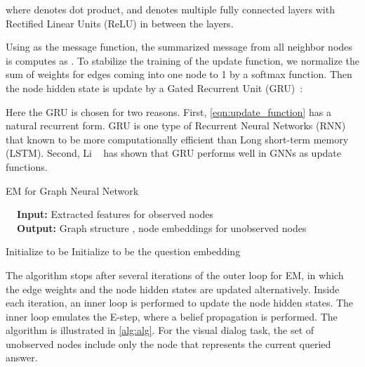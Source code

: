 \documentclass[10pt,twocolumn,letterpaper]{article}
\begin{document}
where  denotes dot product, and  denotes multiple fully connected layers with Rectified Linear Units (ReLU) in between the layers.

Using  as the message function, the summarized message from all neighbor nodes is computes as . To stabilize the training of the update function, we normalize the sum of weights for edges coming into one node to 1 by a softmax function. Then the node hidden state is update by a Gated Recurrent Unit (GRU)~\cite{cho2014learning}:
\vspace{-4pt}

Here the GRU is chosen for two reasons. First, \autoref{eqn:update_function} has a natural recurrent form. GRU is one type of Recurrent Neural Networks (RNN) that known to be more computationally efficient than Long short-term memory (LSTM). Second, Li \etal~\cite{li2016gated} has shown that GRU performs well in GNNs as update functions.

\begin{algorithm}[!t]\small
\caption{\small EM for Graph Neural Network}
\label{alg:alg}
\begin{flushleft}
\textbf{~~Input:} Extracted features  for observed nodes \\
\textbf{~~Output:} Graph structure , node embeddings  for unobserved nodes 
\end{flushleft}
\vspace{-10pt}
\begin{algorithmic}[1]
\STATE Initialize  to be 
\ENDFOR
{}
\STATE Initialize  to be the question embedding
\ENDFOR
{}
\STATE 
\ENDFOR
{}
\STATE 
{}
\STATE 
\ENDFOR
\ENDFOR
\ENDWHILE
\end{algorithmic}
\end{algorithm}

The algorithm stops after several iterations of the outer loop for EM, in which the edge weights  and the node hidden states  are updated alternatively. Inside each iteration, an inner loop is performed to update the node hidden states. The inner loop emulates the E-step, where a belief propagation is performed. The algorithm is illustrated in \autoref{alg:alg}. For the visual dialog task, the set of unobserved nodes include only the node that represents the current queried answer.
\end{document}
